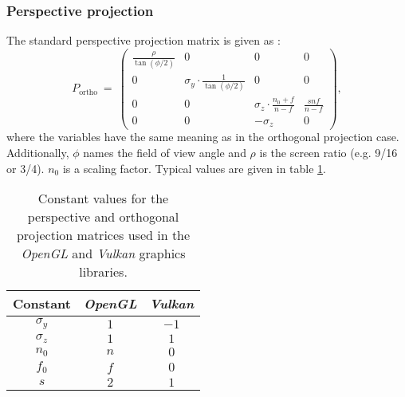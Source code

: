 \subsubsection{Perspective projection}
The standard perspective projection matrix is given as \cite{web_gl_perspective}:
\begin{equation}
	P_{\mathrm{ortho}} \ =\
		\left( \begin{array}{cccc}
			\frac{\rho}{\tan\left(\phi/2 \right)} &                                                  0 &                                 0 &  0                 \\
			                                    0 &  \sigma_y \cdot \frac{1}{\tan\left(\phi/2 \right)} &                                 0 &  0                 \\
			                                    0 &                                                  0 &  \sigma_z \cdot \frac{n_0+f}{n-f} &  \frac{s n f}{n-f} \\
			                                    0 &                                                  0 &                         -\sigma_z &  0
		\end{array} \right),
\end{equation}
where the variables have the same meaning as in the orthogonal projection case.
Additionally, $\phi$ names the field of view angle and $\rho$ is the screen ratio (e.g. 9/16 or 3/4).
$n_0$ is a scaling factor. Typical values are given in table \ref{tab:gl_constants}.


\begin{table}[htb]
	\centering
	\begin{tabular}{|c|cc|}
		\hline
		    Constant &  \textit{OpenGL} &   \textit{Vulkan} \tabularnewline
		\hline
		  $\sigma_y$ &              $1$ &              $-1$ \tabularnewline
		  $\sigma_z$ &              $1$ &               $1$ \tabularnewline
		       $n_0$ &              $n$ &               $0$ \tabularnewline
		       $f_0$ &              $f$ &               $0$ \tabularnewline
		         $s$ &              $2$ &               $1$ \tabularnewline
		\hline
	\end{tabular}
	\caption[Projection matrix constants]{
		Constant values for the perspective and orthogonal projection matrices used in the
		\textit{OpenGL} \cite{web_OpenGL} and \textit{Vulkan} \cite{web_Vulkan} graphics libraries.}
	\label{tab:gl_constants}
\end{table}



